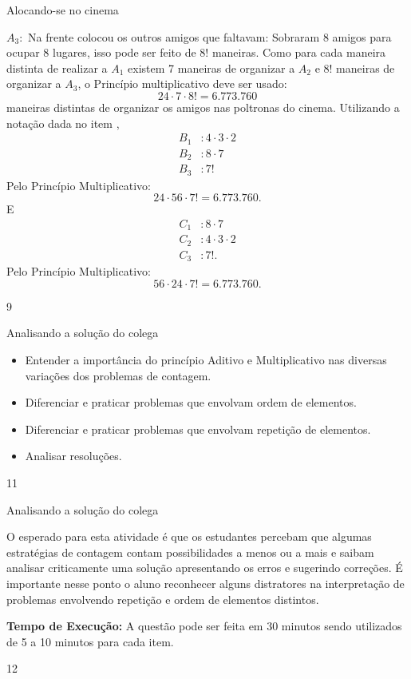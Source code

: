 \begin{answer}{Alocando-se no cinema}
{\begin{enumerate}
$A_3:$ Na frente colocou os outros amigos que faltavam: Sobraram 8 amigos para ocupar 8 lugares, isso pode ser feito de $8!$ maneiras. Como para cada maneira distinta de realizar a $A_1$ existem 7 maneiras de organizar a $A_2$ e $8!$ maneiras de organizar a $A_3$, o Princípio multiplicativo deve ser usado:
$$24 \cdot 7 \cdot 8!= 6.773.760$$
maneiras distintas de organizar os amigos nas poltronas do cinema. 
Utilizando a notação dada no item ,\small
\begin{align*}
B_1&: 4\cdot 3 \cdot 2 \\
B_2&: 8 \cdot 7\\
B_3&: 7!
\end{align*}
Pelo Princípio Multiplicativo: 
$$24\cdot 56 \cdot 7!= 6.773.760.$$ 
E
\begin{align*}
C_1&: 8 \cdot 7\\
C_2&: 4\cdot 3 \cdot 2 \\
C_3&: 7!.
\end{align*}
Pelo Princípio Multiplicativo: 
$$ 56 \cdot 24 \cdot 7!= 6.773.760.$$
\end{enumerate}
}{9}
\end{answer}
\begin{objectives}{Analisando a solução do colega}
{
\begin{itemize}
\item Entender a importância do princípio Aditivo e Multiplicativo nas diversas variações dos problemas de contagem.
\item Diferenciar e praticar problemas que envolvam ordem de elementos. 
\item Diferenciar e praticar problemas que envolvam repetição de elementos. 
\item Analisar resoluções. 
\end{itemize}
}{1}{1}
\end{objectives}
\begin{sugestions}{Analisando a solução do colega}
{
O esperado para esta atividade é que os estudantes percebam que algumas estratégias de contagem contam possibilidades a menos ou a mais e saibam analisar criticamente uma solução apresentando os erros e sugerindo correções. É importante nesse ponto o aluno reconhecer alguns distratores na  interpretação de problemas envolvendo repetição e ordem de elementos distintos.

\textbf{Tempo de Execução:} A questão pode ser feita em 30 minutos sendo utilizados de 5  a 10 minutos para cada item. 
}{1}{2}
\end{sugestions}
